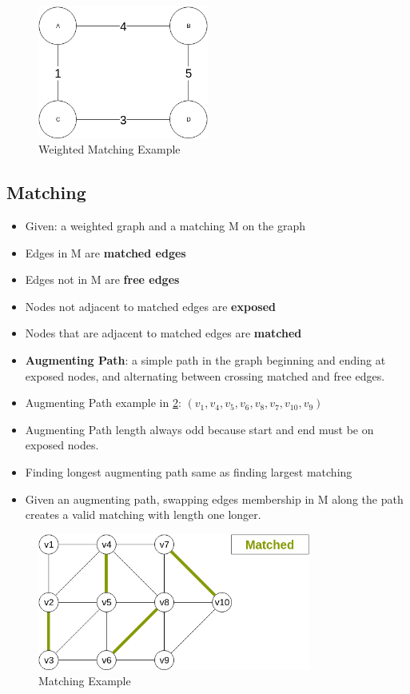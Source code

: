 \documentclass[12pt, letter]{article}
\begin{document}
\begin{figure}[h]
    \centering
    \includegraphics[width=0.5\textwidth]{weighted-matching}
    \caption{Weighted Matching Example}
    \label{fig:weighted-matching}
\end{figure}

\subsection*{Matching}
\begin{itemize}
    \item Given: a weighted graph and a matching M on the graph
    \item Edges in M are \textbf{matched edges} 
    \item Edges not in M are \textbf{free edges} 
    \item Nodes not adjacent to matched edges are \textbf{exposed} 
    \item Nodes that are adjacent to matched edges are \textbf{matched} 
    \item \textbf{Augmenting Path}: a simple path in the graph beginning and ending at exposed nodes, and alternating between crossing matched and free edges.
    \item Augmenting Path example in \ref{fig:matching}: $(v_1,v_4,v_5,v_6,v_8,v_7,v_{10},v_9)$
    \item Augmenting Path length always odd because start and end must be on exposed nodes.
    \item Finding longest augmenting path same as finding largest matching
    \item Given an augmenting path, swapping edges membership in M along the path creates a valid matching with length one longer.
\end{itemize}

\begin{figure}[h]
    \centering
    \includegraphics[width=0.8\textwidth]{matching}
    \caption{Matching Example}
    \label{fig:matching}
\end{figure}
\end{document}
